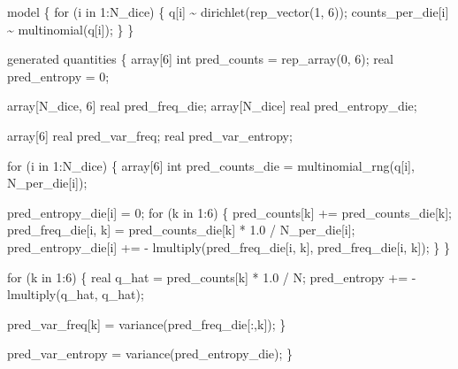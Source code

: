 \documentclass[
  letterpaper,
  DIV=11,
  numbers=noendperiod]{scrartcl}
\newenvironment{Shaded}{\begin{snugshade}}{\end{snugshade}}
\newcommand{\ControlFlowTok}[1]{\textcolor[rgb]{0.00,0.23,0.31}{#1}}
\newcommand{\DataTypeTok}[1]{\textcolor[rgb]{0.68,0.00,0.00}{#1}}
\newcommand{\DecValTok}[1]{\textcolor[rgb]{0.68,0.00,0.00}{#1}}
\newcommand{\FloatTok}[1]{\textcolor[rgb]{0.68,0.00,0.00}{#1}}
\newcommand{\KeywordTok}[1]{\textcolor[rgb]{0.00,0.23,0.31}{#1}}
\newcommand{\NormalTok}[1]{\textcolor[rgb]{0.00,0.23,0.31}{#1}}
\begin{document}
\begin{codelisting}
\begin{Shaded}
\begin{Highlighting}[]
\KeywordTok{model}\NormalTok{ \{}
  \ControlFlowTok{for}\NormalTok{ (i }\ControlFlowTok{in} \DecValTok{1}\NormalTok{:N\_dice) \{}
\NormalTok{    q[i] \textasciitilde{} dirichlet(rep\_vector(}\DecValTok{1}\NormalTok{, }\DecValTok{6}\NormalTok{));}
\NormalTok{    counts\_per\_die[i] \textasciitilde{} multinomial(q[i]);}
\NormalTok{  \}}
\NormalTok{\}}

\KeywordTok{generated quantities}\NormalTok{ \{}
  \DataTypeTok{array}\NormalTok{[}\DecValTok{6}\NormalTok{] }\DataTypeTok{int}\NormalTok{ pred\_counts = rep\_array(}\DecValTok{0}\NormalTok{, }\DecValTok{6}\NormalTok{);}
  \DataTypeTok{real}\NormalTok{ pred\_entropy = }\DecValTok{0}\NormalTok{;}

  \DataTypeTok{array}\NormalTok{[N\_dice, }\DecValTok{6}\NormalTok{] }\DataTypeTok{real}\NormalTok{ pred\_freq\_die;}
  \DataTypeTok{array}\NormalTok{[N\_dice] }\DataTypeTok{real}\NormalTok{ pred\_entropy\_die;}

  \DataTypeTok{array}\NormalTok{[}\DecValTok{6}\NormalTok{] }\DataTypeTok{real}\NormalTok{ pred\_var\_freq;}
  \DataTypeTok{real}\NormalTok{ pred\_var\_entropy;}

  \ControlFlowTok{for}\NormalTok{ (i }\ControlFlowTok{in} \DecValTok{1}\NormalTok{:N\_dice) \{}
    \DataTypeTok{array}\NormalTok{[}\DecValTok{6}\NormalTok{] }\DataTypeTok{int}\NormalTok{ pred\_counts\_die = multinomial\_rng(q[i], N\_per\_die[i]);}

\NormalTok{    pred\_entropy\_die[i] = }\DecValTok{0}\NormalTok{;}
    \ControlFlowTok{for}\NormalTok{ (k }\ControlFlowTok{in} \DecValTok{1}\NormalTok{:}\DecValTok{6}\NormalTok{) \{}
\NormalTok{      pred\_counts[k] += pred\_counts\_die[k];}
\NormalTok{      pred\_freq\_die[i, k] = pred\_counts\_die[k] * }\FloatTok{1.0}\NormalTok{ / N\_per\_die[i];}
\NormalTok{      pred\_entropy\_die[i] += {-} lmultiply(pred\_freq\_die[i, k],}
\NormalTok{                                         pred\_freq\_die[i, k]);}
\NormalTok{    \}}
\NormalTok{  \}}

  \ControlFlowTok{for}\NormalTok{ (k }\ControlFlowTok{in} \DecValTok{1}\NormalTok{:}\DecValTok{6}\NormalTok{) \{}
    \DataTypeTok{real}\NormalTok{ q\_hat = pred\_counts[k] * }\FloatTok{1.0}\NormalTok{ / N;}
\NormalTok{    pred\_entropy += {-} lmultiply(q\_hat, q\_hat);}

\NormalTok{    pred\_var\_freq[k] = variance(pred\_freq\_die[:,k]);}
\NormalTok{  \}}

\NormalTok{  pred\_var\_entropy = variance(pred\_entropy\_die);}
\NormalTok{\}}
\end{Highlighting}
\end{Shaded}

\end{codelisting}
\end{document}
